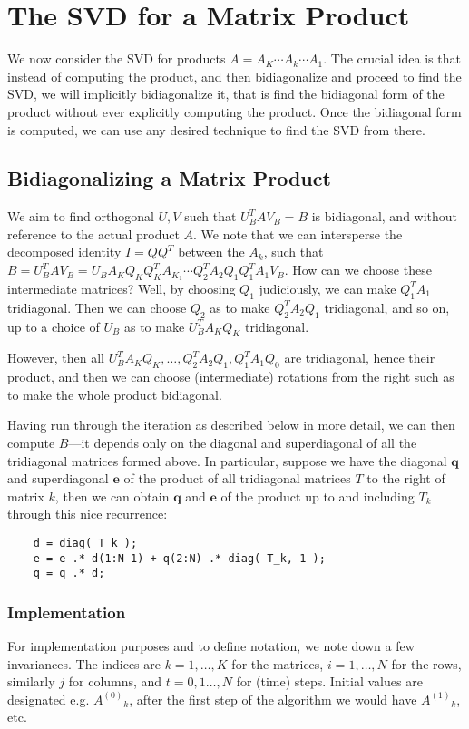 \documentclass[11pt]{article}
\newcommand{\ve}[1]{\ensuremath{\mathbf{#1}}}
\newcommand{\prodijk}[4]{\ensuremath{{#1}_{#2}\cdots{#1}_{#3}\cdots{#1}_{#4}}}
\renewcommand{\j}[2]{\ensuremath{#1^{(#2)}}}	%
\begin{document}
\section{The SVD for a Matrix Product}
We now consider the SVD for products $A=\prodijk AKk1$. The crucial idea is that instead of computing the product, and then bidiagonalize and proceed to find the SVD, we will implicitly bidiagonalize it, that is find the bidiagonal form of the product without ever explicitly computing the product. Once the bidiagonal form is computed, we can use any desired technique to find the SVD from there.

\subsection{Bidiagonalizing a Matrix Product} 
We aim to find orthogonal $U, V$ such that $U_B^TAV_B=B$ is bidiagonal, and without reference to the actual product $A$. We note that we can intersperse the decomposed identity $I=QQ^T$ between the $A_k$, such that $B=U_B^TAV_B=U_B A_K Q_K Q_K^T A_{K_1} \cdots Q_2^T A_2 Q_1 Q_1^T A_1 V_B$. How can we choose these intermediate matrices? Well, by choosing $Q_1$ judiciously, we can make $Q_1^T A_1$ tridiagonal. Then we can choose $Q_2$ as to make $Q_2^T A_2 Q_1$ tridiagonal, and so on, up to a choice of $U_B$ as to make $U_B^T A_K Q_K$ tridiagonal. 

However, then all $U_B^T A_K Q_K, \ldots, Q_2^T A_2 Q_1, Q_1^T A_1 Q_0$ are tridiagonal, hence their product, and then we can choose (intermediate) rotations from the right such as to make the whole product bidiagonal.

Having run through the iteration as described below in more detail, we can then compute $B$---it depends only on the diagonal and superdiagonal of all the tridiagonal matrices formed above. In particular, suppose we have the diagonal \ve q and superdiagonal \ve e of the product of all tridiagonal matrices $T$ to the right of matrix $k$, then we can obtain \ve q and \ve e of the product up to and including $T_k$ through this nice recurrence:
\begin{lstlisting}
	d = diag( T_k );
	e = e .* d(1:N-1) + q(2:N) .* diag( T_k, 1 );
	q = q .* d;
\end{lstlisting}

\subsubsection{Implementation}
For implementation purposes and to define notation, we note down a few invariances. The indices are $k=1,\ldots,K$ for the matrices, $i=1,\ldots,N$ for the rows, similarly $j$ for columns, and $t=0,1\ldots,N$ for (time) steps. Initial values are designated e.g. $\j A0_k$, after the first step of the algorithm we would have $\j A1_k$, etc.
\end{document}
